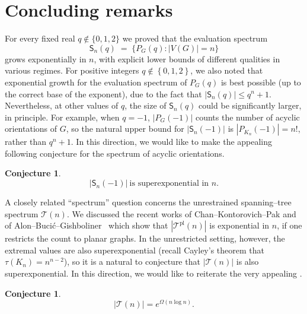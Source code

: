 \documentclass[A4paper,reqno,oneside,12pt]{amsart}
\theoremstyle{plain}
\newtheorem{conjecture}[theorem]{Conjecture}
\theoremstyle{definition}
\DeclareMathOperator{\pl}{\mathrm{pl}}
\begin{document}
\section{Concluding remarks} \label{sec:conclusion}

 For every fixed real $q\notin\{0,1,2\}$ we proved that the evaluation spectrum
\[
\mathsf{S}_n(q)\;=\;\{P_G(q):|V(G)|=n\}
\]
grows exponentially in $n$, with explicit lower bounds of different qualities in various regimes. For positive integers $q \not\in \left\{0,1,2\right\}$, we also noted that exponential growth for the evaluation spectrum of $P_{G}(q)$ is best possible (up to the correct base of the exponent), due to the fact that $|\mathsf{S}_n(q)| \leq q^{n}+1$. Nevertheless, at other values of $q$, the size of $\mathsf{S}_n(q)$ could be significantly larger, in principle. For example, when $q=-1$, $|P_{G}(-1)|$ counts the number of acyclic orientations of $G$, so the natural upper bound for $|\mathsf{S}_n(-1)|$ is $|P_{K_n}(-1)|=n!$, rather than $q^n+1$. In this direction, we would like to make the appealing following conjecture for the spectrum of acyclic orientations. 

\begin{conjecture}\label{conj:superexp_negative}
$$|\mathsf{S}_n(-1)|\ \text{is superexponential in\ } n.$$ 
\end{conjecture}

A closely related ``spectrum'' question concerns the unrestrained spanning--tree spectrum $\mathcal{T}(n)$. We discussed the recent works of Chan--Kontorovich--Pak and of Alon--Buci\'c--Gishboliner~\cite{ChanKontorovichPak24trees,ABG} which show that $|\mathcal{T}^{\pl}(n)|$ is exponential in $n$, if one restricts the count to planar graphs. In the unrestricted setting, however, the extremal values are also superexponential (recall Cayley's theorem that $\tau(K_n)=n^{n-2}$), so it is a natural to conjecture that $|\mathcal{T}(n)|$ is also superexponential. In this direction, we would like to reiterate the very appealing \cite[Conjecture 5.2]{ChanKontorovichPak24trees}.

\begin{conjecture}\label{conj:superexp_tau}
$$|\mathcal{T}(n)| = e^{\Omega(n \log n)}.$$
\end{conjecture}
\end{document}
